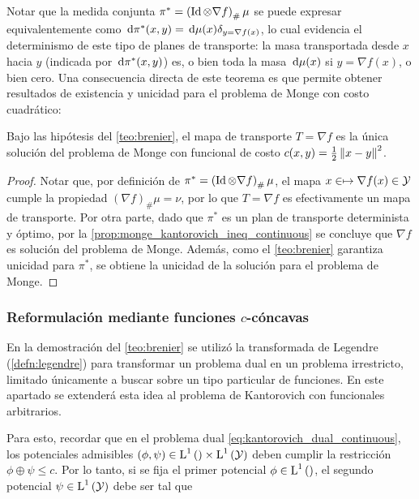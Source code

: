 Notar que la medida conjunta $\pi^* = \left(\operatorname{Id}\otimes \nabla f\right)_\#\mu$ se puede expresar equivalentemente como $\,\operatorname{d}\!\pi^*(x,y) = \,\operatorname{d}\!\mu(x)\delta_{y=\nabla f(x)}$, lo cual evidencia el determinismo de este tipo de planes de transporte: la masa transportada desde $x$ hacia $y$ (indicada por $\,\operatorname{d}\!\pi^*(x,y)$) es, o bien toda la masa $\,\operatorname{d}\!\mu(x)$ si $y=\nabla f(x)$, o bien cero. Una consecuencia directa de este teorema es que permite obtener resultados de existencia y unicidad para el problema de Monge con costo cuadrático:

\begin{cor}
	Bajo las hipótesis del \autoref{teo:brenier}, el mapa de transporte $T=\nabla f$ es la única solución del problema de Monge con funcional de costo $c(x,y)=\frac{1}{2}\left\lVert x-y \right\rVert^2$.
\end{cor}

\begin{proof}
	Notar que, por definición de $\pi^* = \left(\operatorname{Id}\otimes \nabla f\right)_\#\mu$, el mapa $x\in \mapsto \nabla f(x)\in\mathcal{Y}$ cumple la propiedad $(\nabla f)_\#\mu=\nu$, por lo que $T=\nabla f$ es efectivamente un mapa de transporte. Por otra parte, dado que $\pi^*$ es un plan de transporte determinista y óptimo, por la \autoref{prop:monge_kantorovich_ineq_continuous} se concluye que $\nabla f$ es solución del problema de Monge. Además, como el \autoref{teo:brenier} garantiza unicidad para $\pi^*$, se obtiene la unicidad de la solución para el problema de Monge.
\end{proof}

\subsubsection{Reformulación mediante funciones \texorpdfstring{$c$}{c}-cóncavas}

En la demostración del \autoref{teo:brenier} se utilizó la transformada de Legendre (\autoref{defn:legendre}) para transformar un problema dual en un problema irrestricto, limitado únicamente a buscar sobre un tipo particular de funciones. En este apartado se extenderá esta idea al problema de Kantorovich con funcionales arbitrarios.

Para esto, recordar que en el problema dual \eqref{eq:kantorovich_dual_continuous}, los potenciales admisibles $(\phi,\psi)\in \operatorname{L}^{1}\left(\right)\times\operatorname{L}^{1}\left(\mathcal{Y}\right)$ deben cumplir la restricción $\phi\oplus\psi\leq c$. Por lo tanto, si se fija el primer potencial $\phi\in\operatorname{L}^{1}\left(\right)$, el segundo potencial $\psi\in \operatorname{L}^{1}\left(\mathcal{Y}\right)$ debe ser tal que

